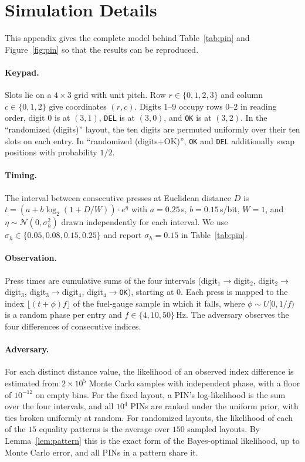 \documentclass[11pt]{article}
\theoremstyle{remark}
\begin{document}
\appendix
\section{Simulation Details}
\label{app:sim}
This appendix gives the complete model behind Table~\ref{tab:pin} and Figure~\ref{fig:pin} so that the results can be reproduced.

\paragraph{Keypad.} Slots lie on a $4\times 3$ grid with unit pitch. Row $r \in \{0,1,2,3\}$ and column $c \in \{0,1,2\}$ give coordinates $(r,c)$. Digits $1$--$9$ occupy rows $0$--$2$ in reading order, digit $0$ is at $(3,1)$, \texttt{DEL} is at $(3,0)$, and \texttt{OK} is at $(3,2)$. In the ``randomized (digits)'' layout, the ten digits are permuted uniformly over their ten slots on each entry. In ``randomized (digits+OK)'', \texttt{OK} and \texttt{DEL} additionally swap positions with probability $1/2$.

\paragraph{Timing.} The interval between consecutive presses at Euclidean distance $D$ is $t = (a + b\log_2(1 + D/W))\cdot e^{\eta}$ with $a = 0.25$\,s, $b = 0.15$\,s/bit, $W = 1$, and $\eta \sim \mathcal{N}(0, \sigma_h^2)$ drawn independently for each interval. We use $\sigma_h \in \{0.05, 0.08, 0.15, 0.25\}$ and report $\sigma_h = 0.15$ in Table~\ref{tab:pin}.

\paragraph{Observation.} Press times are cumulative sums of the four intervals (digit$_1\!\to$digit$_2$, digit$_2\!\to$digit$_3$, digit$_3\!\to$digit$_4$, digit$_4\!\to$\texttt{OK}), starting at $0$. Each press is mapped to the index $\lfloor (t + \phi) f \rfloor$ of the fuel-gauge sample in which it falls, where $\phi \sim U[0, 1/f)$ is a random phase per entry and $f \in \{4, 10, 50\}$\,Hz. The adversary observes the four differences of consecutive indices.

\paragraph{Adversary.} For each distinct distance value, the likelihood of an observed index difference is estimated from $2\times 10^5$ Monte Carlo samples with independent phase, with a floor of $10^{-12}$ on empty bins. For the fixed layout, a PIN's log-likelihood is the sum over the four intervals, and all $10^4$ PINs are ranked under the uniform prior, with ties broken uniformly at random. For randomized layouts, the likelihood of each of the $15$ equality patterns is the average over $150$ sampled layouts. By Lemma~\ref{lem:pattern} this is the exact form of the Bayes-optimal likelihood, up to Monte Carlo error, and all PINs in a pattern share it.
\end{document}
